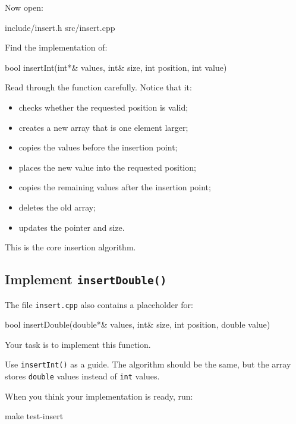 \documentclass{csc2059practical}
\begin{document}
Now open:

\begin{terminal}
include/insert.h
src/insert.cpp
\end{terminal}

Find the implementation of:

\begin{cppcode}
bool insertInt(int*& values, int& size, int position, int value)
\end{cppcode}

Read through the function carefully. Notice that it:

\begin{itemize}
    \item checks whether the requested position is valid;
    \item creates a new array that is one element larger;
    \item copies the values before the insertion point;
    \item places the new value into the requested position;
    \item copies the remaining values after the insertion point;
    \item deletes the old array;
    \item updates the pointer and size.
\end{itemize}

This is the core insertion algorithm.

\subsection{Implement \texttt{insertDouble()}}

The file \texttt{insert.cpp} also contains a placeholder for:

\begin{cppcode}
bool insertDouble(double*& values, int& size, int position, double value)
\end{cppcode}

Your task is to implement this function.

Use \texttt{insertInt()} as a guide. The algorithm should be the same, but the array stores \texttt{double} values instead of \texttt{int} values.

When you think your implementation is ready, run:

\begin{terminal}
make test-insert
\end{terminal}
\end{document}
